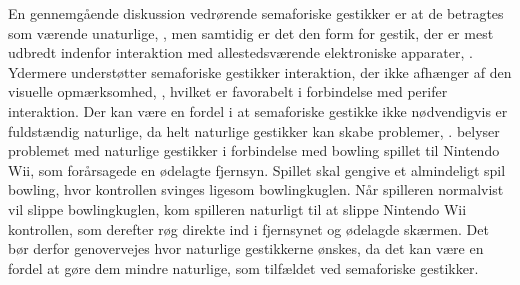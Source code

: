 En gennemgående diskussion vedrørende semaforiske gestikker er at de betragtes som værende unaturlige, \parencite[s. 1961]{PDF:AStudyOnTheUseOfSemaphoricGestures}, men samtidig er det den form for gestik, der er mest udbredt indenfor interaktion med allestedsværende elektroniske apparater, \parencite[s. 28]{PDF:ATaxonomyOfGestures}. Ydermere understøtter semaforiske gestikker interaktion, der ikke afhænger af den visuelle opmærksomhed, \parencite[s. 1964]{PDF:AStudyOnTheUseOfSemaphoricGestures}, hvilket er favorabelt i forbindelse med perifer interaktion. Der kan være en fordel i at semaforiske gestikke ikke nødvendigvis er fuldstændig naturlige, da helt naturlige gestikker kan skabe problemer, \parencite[s. 9]{PDF:NaturalUserInterfaces}. \textcite[s. 9]{PDF:NaturalUserInterfaces} belyser problemet med naturlige gestikker i forbindelse med bowling spillet til Nintendo Wii, som forårsagede en ødelagte fjernsyn. Spillet skal gengive et almindeligt spil bowling, hvor kontrollen svinges ligesom bowlingkuglen. Når spilleren normalvist vil slippe bowlingkuglen, kom spilleren naturligt til at slippe Nintendo Wii kontrollen, som derefter røg direkte ind i fjernsynet og ødelagde skærmen. Det bør derfor genovervejes hvor naturlige gestikkerne ønskes, da det kan være en fordel at gøre dem mindre naturlige, som tilfældet ved semaforiske gestikker.
%
